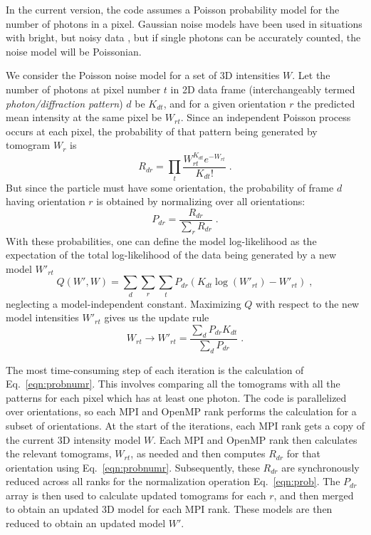 \documentclass[]{iucr}              %
\begin{document}
In the current version, the code assumes a Poisson probability model for the number of photons in a pixel. 
Gaussian noise models have been used in situations with bright, but noisy data \cite{loh2010,ekeberg2015}, but if single photons can be accurately counted, the noise model will be Poissonian. 

We consider the Poisson noise model for a set of 3D intensities $W$. Let the number of photons at pixel number $t$ in 2D data frame (interchangeably termed {\it photon/diffraction pattern}) $d$ be $K_{dt}$, and for a given orientation $r$ the predicted mean intensity at the same pixel be $W_{rt}$. Since an independent Poisson process occurs at each pixel, the probability of that pattern being generated by tomogram $W_r$ is
\begin{equation}
R_{dr} = \prod_t \frac{W_{rt}^{K_{dt}} e^{-W_{rt}}}{K_{dt}!} \;.
\label{eqn:probnumr}
\end{equation}
But since the particle must have some orientation, the probability of frame $d$ having orientation $r$ is obtained by normalizing over all orientations:
\begin{equation}
P_{dr} = \frac{R_{dr}}{\sum\limits_r R_{dr}}\;.
\label{eqn:prob}
\end{equation}
With these probabilities, one can define the model log-likelihood as the expectation of the total log-likelihood of the data being generated by a new model $W'_{rt}$
\begin{equation}
Q(W', W) = \sum_d \sum_r \sum_t P_{dr} (K_{dt} \log(W'_{rt}) - W'_{rt}) \;, 
\label{eqn:totalq}
\end{equation}
neglecting a model-independent constant. Maximizing $Q$ with respect to the new model intensities $W'_{rt}$ gives us the update rule
\begin{equation}
W_{rt} \longrightarrow W'_{rt} = \frac{\sum\limits_d P_{dr} K_{dt}}{\sum\limits_d P_{dr}}\;.
\label{eqn:wupdate}
\end{equation}

The most time-consuming step of each iteration is the calculation of Eq.~\ref{eqn:probnumr}. This involves comparing all the tomograms with all the patterns for each pixel which has at least one photon. The code is parallelized over orientations, so each MPI and OpenMP rank performs the calculation for a subset of orientations. At the start of the iterations, each MPI rank gets a copy of the current 3D intensity model $W$. Each MPI and OpenMP rank then calculates the relevant tomograms, $W_{rt}$, as needed and then computes $R_{dr}$ for that orientation using Eq.~\ref{eqn:probnumr}. Subsequently, these $R_{dr}$ are synchronously reduced across all ranks for the normalization operation Eq.~\ref{eqn:prob}. The $P_{dr}$ array is then used to calculate updated tomograms for each $r$, and then merged to obtain an updated 3D model for each MPI rank. These models are then reduced to obtain an updated model $W'$.
\end{document}
